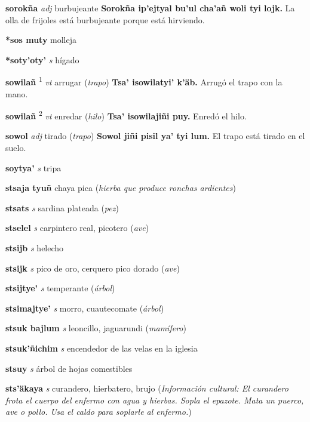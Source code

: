 \documentclass[10pt]{scrbook}
\newcommand{\entry}[1]{\textbf{#1}}
\newcommand{\defsuperscript}[1]{\textsuperscript{#1}}
\newcommand{\partofspeech}[1]{\textit{#1}}
\newcommand{\spanishtranslation}[1]{#1}
\newcommand{\clarification}[1]{(\textit{#1})}
\newcommand{\cholexample}[1]{\textbf{#1}}
\newcommand{\exampletranslation}[1]{#1}
\newcommand{\culturalinformation}[1]{(\textit{#1})}
\begin{document}
\begin{multicols}{2}
\entry{sorokña}
\partofspeech{adj}
\spanishtranslation{burbujeante}
\cholexample{Sorokña ip'ejtyal bu'ul cha'añ woli tyi lojk.}
\exampletranslation{La olla de frijoles está burbujeante porque está hirviendo.}

\entry{*sos muty}
\spanishtranslation{molleja}

\entry{*soty'oty'}
\partofspeech{s}
\spanishtranslation{hígado}

\entry{sowilañ}
\defsuperscript{1}
\partofspeech{vt}
\spanishtranslation{arrugar}
\clarification{trapo}
\cholexample{Tsa' isowilatyi' k'äb.}
\exampletranslation{Arrugó el trapo con la mano.}

\entry{sowilañ}
\defsuperscript{2}
\partofspeech{vt}
\spanishtranslation{enredar}
\clarification{hilo}
\cholexample{Tsa' isowilajiñi puy.}
\exampletranslation{Enredó el hilo.}

\entry{sowol}
\partofspeech{adj}
\spanishtranslation{tirado}
\clarification{trapo}
\cholexample{Sowol jiñi pisil ya' tyi lum.}
\exampletranslation{El trapo está tirado en el suelo.}

\entry{soytya'}
\partofspeech{s}
\spanishtranslation{tripa}

\entry{stsaja tyuñ}
\spanishtranslation{chaya pica}
\clarification{hierba que produce ronchas ardientes}

\entry{stsats}
\partofspeech{s}
\spanishtranslation{sardina plateada}
\clarification{pez}

\entry{stselel}
\partofspeech{s}
\spanishtranslation{carpintero real, picotero}
\clarification{ave}

\entry{stsijb}
\partofspeech{s}
\spanishtranslation{helecho}

\entry{stsijk}
\partofspeech{s}
\spanishtranslation{pico de oro, cerquero pico dorado}
\clarification{ave}

\entry{stsijtye'}
\partofspeech{s}
\spanishtranslation{temperante}
\clarification{árbol}

\entry{stsimajtye'}
\partofspeech{s}
\spanishtranslation{morro, cuautecomate}
\clarification{árbol}

\entry{stsuk bajlum}
\partofspeech{s}
\spanishtranslation{leoncillo, jaguarundi}
\clarification{mamífero}

\entry{stsuk'ñichim}
\partofspeech{s}
\spanishtranslation{encendedor de las velas en la iglesia}

\entry{stsuy}
\partofspeech{s}
\spanishtranslation{árbol de hojas comestibles}

\entry{sts'äkaya}
\partofspeech{s}
\spanishtranslation{curandero, hierbatero, brujo}
\culturalinformation{Información cultural: El curandero frota el cuerpo del enfermo con agua y hierbas. Sopla el epazote. Mata un puerco, ave o pollo. Usa el caldo para soplarle al enfermo.}


\end{multicols}
\end{document}
